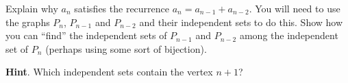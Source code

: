 \documentclass{book}
\begin{document}
\setcounter{cpjt}{133}
\addtocounter{cpjt}{-1}
\begin{activity}\label{activity-126}
\hypertarget{p-888}{}%
Explain why \(a_n\) satisfies the recurrence \(a_n = a_{n-1} + a_{n-2}\).  You will need to use the graphs \(P_n\), \(P_{n-1}\) and \(P_{n-2}\) and their independent sets to do this.  Show how you can ``find'' the independent sets of \(P_{n-1}\) and \(P_{n-2}\) among the independent set of \(P_{n}\) (perhaps using some sort of bijection).%
\par\smallskip%
\noindent\textbf{Hint}.\hypertarget{hint-91}{}\quad%
\hypertarget{p-889}{}%
Which independent sets contain the vertex \(n+1\)?%
\end{activity}

\clearpage
\end{document}
